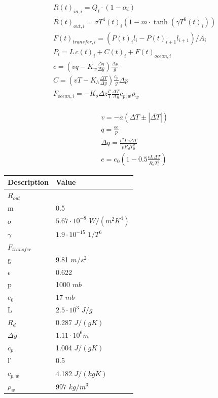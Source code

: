 \documentclass[11pt]{beamer}
\begin{document}
\begin{frame}[noframenumbering]
\begin{align*}
&R(t)_{in,i} =  Q_i\cdot(1-\alpha_i)\\
&R(t)_{out,i}  =  \sigma T^4(t)_i (1-m\cdot \tanh{(\gamma T^6(t)_i)})\\
&F(t)_{transfer,i}  =  (P(t)_i l_i-P(t)_{i+1} l_{i+1})/ A_i\\
&P_i=  L\,c(t)_i+C(t)_i+F(t)_{ocean,i}\\
&c=\left(vq-K_w\frac{\Delta q}{\Delta y}\right)\frac{\Delta p}{g}\\
&C=\left(vT-K_h\frac{\Delta T}{\Delta y}\right) \frac{c_p}{g}\Delta p\\
&F_{ocean,i}=-K_o \Delta z \frac{l'}{l} \frac{\Delta T}{\Delta y} c_{p,w} \rho_w\\
\end{align*}
\end{frame}

\begin{frame}[noframenumbering]
\begin{align*}
&v=-a(\Delta T\pm |\overline{\Delta T}|)\\
&q=\frac{\epsilon e}{p}\\
&\Delta q =\frac{\epsilon^2 Le\Delta T}{p R_d T_0^2}\\
&e =  e_0 \left(1 - 0.5\frac{\epsilon L \Delta T }{R_d T_0^2}\right)
\end{align*}
\end{frame}

\begin{frame}[noframenumbering]
\begin{tabular}{l|l}\hline\hline
Description & Value\\\hline\hline
\underline{$R_{out}$} & \\
m & 0.5 \\
$\sigma$ & $5.67\cdot 10^{-8}$ $W/(m^2 K^4)$ \\
$\gamma$ & $1.9 \cdot 10^{-15} $ $1/T^6$\\\hline
\underline{$F_{transfer}$} & \\
g & 9.81 $m/s^2$ \\
$\epsilon$ & 0.622 \\
p & 1000 $mb$ \\
$e_0$ & 17 $mb$ \\
L &  $2.5\cdot 10^3$ $J/g$ \\
$R_d$ & 0.287 $J/(g K)$\\
$\Delta y$ & $1.11\cdot10^6 m$ \\
$c_p$ & 1.004 $J/(g K)$\\
l' & 0.5 \\
$c_{p,w}$ & 4.182 $J/(kg K)$\\
$\rho_w$ & 997 $kg / m^3$
\end{tabular}
\end{frame}
\end{document}
